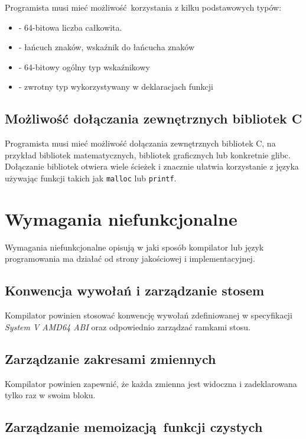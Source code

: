 Programista musi mieć możliwość korzystania z kilku podstawowych typów:

\begin{itemize}
    \item[int] - 64-bitowa liczba całkowita.
    \item[str] - łańcuch znaków, wskaźnik do łańcucha znaków
    \item[ptr] - 64-bitowy ogólny typ wskaźnikowy
    \item[any] - zwrotny typ wykorzystywany w deklaracjach funkcji
\end{itemize}
\subsection{Możliwość dołączania zewnętrznych bibliotek C}

Programista musi mieć możliwość dołączania zewnętrznych bibliotek C, na przykład bibliotek matematycznych, bibliotek graficznych lub konkretnie glibc. Dołączanie bibliotek otwiera wiele ścieżek i znacznie ułatwia korzystanie z języka używając funkcji takich jak \verb|malloc| lub \verb|printf|. 

\section{Wymagania niefunkcjonalne}

Wymagania niefunkcjonalne opisują w jaki sposób kompilator lub język programowania ma działać od strony jakościowej i implementacyjnej.

\subsection{Konwencja wywołań i zarządzanie stosem}

Kompilator powinien stosować konwencję wywołań zdefiniowanej w specyfikacji \textit{System V AMD64 ABI} \cite{bib:system-v-amd64-abi} oraz odpowiednio zarządzać ramkami stosu.

\subsection{Zarządzanie zakresami zmiennych}

Kompilator powinien zapewnić, że każda zmienna jest widoczna i zadeklarowana tylko raz w swoim bloku.

\subsection{Zarządzanie memoizacją funkcji czystych}

